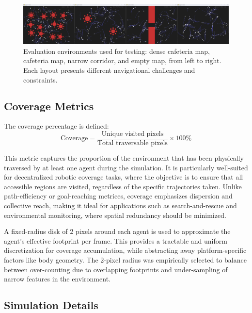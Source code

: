 \documentclass[12pt]{article}
\begin{document}
\begin{figure}[h!]
    \centering
    \includegraphics[width=\linewidth, trim=0 0 0 35, clip]{boids_maps.png}
    \caption{Evaluation environments used for testing: dense cafeteria map, cafeteria map, narrow corridor, and empty map, from left to right. Each layout presents different navigational challenges and constraints.}
    \label{fig:boids_maps}
  \end{figure}

\subsection{Coverage Metrics}

The coverage percentage is defined:
\[\text{Coverage} = \frac{\text{Unique visited pixels}}{\text{Total traversable pixels}} \times 100\%\]

This metric captures the proportion of the environment that has been physically traversed by at least one agent during the simulation. It is particularly well-suited for decentralized robotic coverage tasks, where the objective is to ensure that all accessible regions are visited, regardless of the specific trajectories taken. Unlike path-efficiency or goal-reaching metrices, coverage emphasizes dispersion and collective reach, making it ideal for applications such as search-and-rescue and environmental monitoring, where spatial redundancy should be minimized.

A fixed-radius disk of 2 pixels around each agent is used to approximate the agent's effective footprint per frame. This provides a tractable and uniform discretization for coverage accumulation, while abstracting away platform-specific factors like body geometry. The 2-pixel radius was empirically selected to balance between over-counting due to overlapping footprints and under-sampling of narrow features in the environment.


\subsection{Simulation Details}
\end{document}
